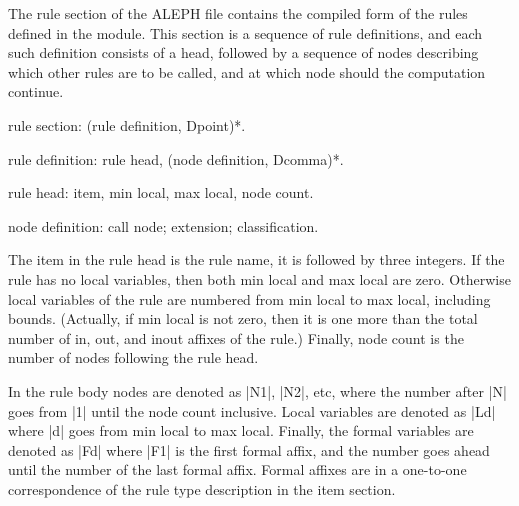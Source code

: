 \documentclass[titlepage]{article}
\newcommand\A{\textsf{ALEPH}}
\newenvironment{grammar}{%
\begin{list}{}{%
\setlength\leftmargin{18pt}%
\setlength\rightmargin{-5pt}%
\setlength\listparindent{20pt}%
\setlength\itemsep{1pt plus0.2ex}%
\setlength\parsep{0pt plus 2pt}%
\setlength\labelsep{-5pt}%
}\color{blue!90!black}\sf\mkoptions%
}{\end{list}}
\newcommand\g[1]{\textsf{\color{blue!90!black}#1}}
\begin{document}
The \g{rule section} of the \A{} file contains the compiled form of the
rules defined in the module. This section is a sequence of \g{rule
definition}s, and each such definition consists of a head, followed by a 
sequence of \g{node}s describing which other rules are to be called, and at
which node should the computation continue.
\begin{grammar}
\item rule section: (rule definition, Dpoint)*.
\item rule definition: rule head, (node definition, Dcomma)*.
\item rule head: item, min local, max local, node count.
\item node definition: call node; extension; classification.
\end{grammar}
The \g{item} in the \g{rule head} is the rule name, it is followed by three
integers. If the rule has no local
variables, then both \g{min local} and \g{max local} are zero. Otherwise
local variables of the rule
are numbered from \g{min local} to \g{max local}, including bounds.
(Actually, if \g{min local} is not zero, then it is one more than the total
number of in, out, and inout affixes of the rule.) Finally, \g{node count} 
is the number of nodes following the rule head. 

In the rule body nodes are denoted as \pp|N1|, \pp|N2|, etc, where the
number after \pp|N| goes from \pp|1| until the node count inclusive. Local
variables are denoted as \pp|Ld| where \pp|d| goes from \g{min local} to
\g{max local}. Finally, the formal variables are denoted as \pp|Fd| where
\pp|F1| is the first formal affix, and the number goes ahead until the
number of the last formal affix. Formal affixes are in a one-to-one
correspondence of the rule type description in the \g{item section}.
\end{document}
